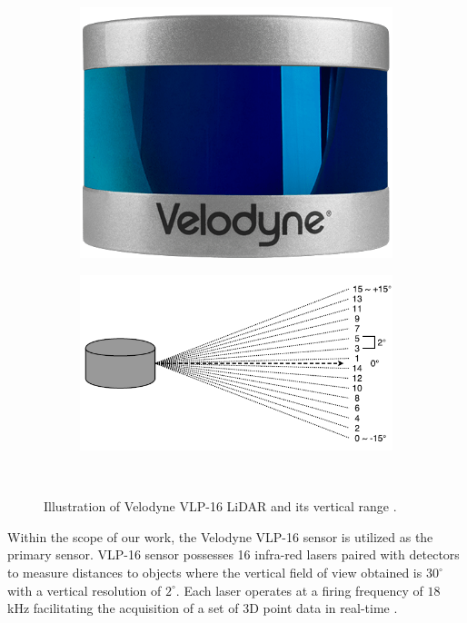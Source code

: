 \begin{figure}[ht]
    \begin{subfigure}{.48\linewidth}
    \centering
    \includegraphics[scale=0.3]{Img/00_VLP-16_1.png}
    \end{subfigure}
    \begin{subfigure}{0.48\linewidth}
    \centering
    \includegraphics[width = \linewidth]{Img/00_VLP-16_2.png}
    \end{subfigure}\\
\caption{Illustration of Velodyne VLP-16 LiDAR and its vertical range \cite{VLP-photo}\cite{VLP-vertical}.}
\end{figure}

Within the scope of our work, the Velodyne VLP-16 sensor is utilized as the primary sensor. VLP-16 sensor possesses 16 infra-red lasers paired with detectors to measure distances to objects where the vertical field of view obtained is $30 ^{\circ}$ with a vertical resolution of $2 ^{\circ}$. Each laser operates at a firing frequency of $18$ kHz facilitating the acquisition of a set of 3D point data in real-time \cite{VLP-16}.\\

